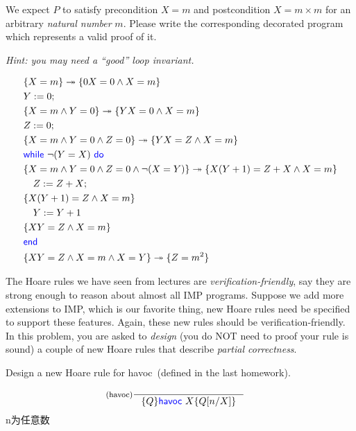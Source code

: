 \documentclass[11pt,a4paper]{article}
\newcommand{\kword}[1]{{\color{blue} \textsf{#1}}}
\newcommand{\While}{\kword{while}}
\newcommand{\Do}{\kword{do}}
\newcommand{\End}{\kword{end}}
\newcommand{\Havoc}{\kword{havoc}}
\let\implies\twoheadrightarrow
\begin{document}
We expect $P$ to satisfy precondition $X = m$ and postcondition $X = m \times m$ for an arbitrary \emph{natural number} $m$.
Please write the corresponding decorated program which represents a valid proof of it.

\emph{Hint: you may need a ``good'' loop invariant.}

\begin{solution}
\begin{align*}
&\{X = m\} \implies \{0X = 0 \land X = m\}\\
&  Y := 0; \\
&\{X = m \land Y = 0\} \implies \{YX = 0 \land X = m\}\\
&Z := 0; \\
&\{X = m \land Y = 0 \land Z = 0\} \implies \{YX = Z  \land X = m\}\\
&\While~\lnot(Y = X)~\Do \\
&\{X = m \land Y = 0 \land Z = 0 \land \lnot(X = Y)\} \implies \{X(Y + 1) = Z + X \land X = m\}\\
&\quad Z := Z + X; \\
&\{X(Y + 1) = Z  \land X = m\}\\
&\quad Y := Y + 1 \\
&\{XY = Z \land X = m\}\\
& \End\\
&\{XY = Z \land X = m \land X = Y\} \implies \{Z = m^{2}\}\\
\end{align*}
\end{solution}

\newpage
{}

The Hoare rules we have seen from lectures are \emph{verification-friendly}, say they are strong enough to reason about almost all IMP programs.
Suppose we add more extensions to IMP, which is our favorite thing, new Hoare rules need be specified to support these features.
Again, these new rules should be verification-friendly.
In this problem, you are asked to \emph{design} (you do NOT need to proof your rule is sound) a couple of new Hoare rules that describe \emph{partial correctness}.

\subproblem Design a new Hoare rule for \Havoc~(defined in the last homework).

\begin{solution}
	\begin{align*}
    &\inference[(havoc)]{}{ \{Q\}\Havoc~ X\{Q[n/X]\} }
	\end{align*}
n为任意数
\end{solution}
\end{document}
